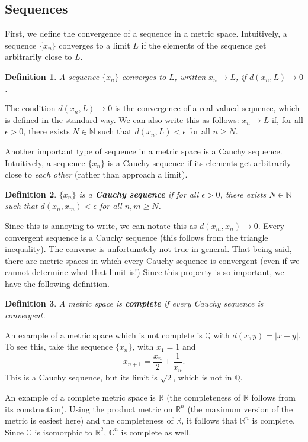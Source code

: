 \documentclass[12pt]{amsart}         %
\newtheorem{definition}{Definition}[section]
\theoremstyle{remark}
\newcommand{\N}{\mathbb{N}}
\newcommand{\C}{\mathbb{C}}
\newcommand{\R}{\mathbb{R}}
\newcommand{\Q}{\mathbb{Q}}
\begin{document}
\subsection{Sequences}

First, we define the convergence of a sequence in a metric space. Intuitively, a sequence $\{x_n\}$ converges to a limit $L$ if the elements of the sequence get arbitrarily close to $L$.
\begin{definition}
A sequence $\{x_n\}$ \emph{converges} to $L$, written $x_n \rightarrow L$, if $d(x_n, L) \rightarrow 0$.
\end{definition}
The condition $d(x_n, L) \rightarrow 0$ is the convergence of a real-valued sequence, which is defined in the standard way. We can also write this as follows: $x_n \rightarrow L$ if, for all $\epsilon > 0$, there exists $N \in \N$ such that $d(x_n, L) < \epsilon$ for all $n \geq N$. 

Another important type of sequence in a metric space is a Cauchy sequence. Intuitively, a sequence $\{x_n\}$ is a Cauchy sequence if its elements get arbitrarily close to \emph{each other} (rather than approach a limit).
\begin{definition}
$\{x_n\}$ is a \textbf{Cauchy sequence} if for all $\epsilon > 0$, there exists $N \in \N$ such that $d(x_n, x_m) < \epsilon$ for all $n,m \geq N$.
\end{definition}
Since this is annoying to write, we can notate this as $d(x_m, x_n) \rightarrow 0$. Every convergent sequence is a Cauchy sequence (this follows from the triangle inequality). The converse is unfortunately not true in general. That being said, there are metric spaces in which every Cauchy sequence is convergent (even if we cannot determine what that limit is!) Since this property is so important, we have the following definition.

\begin{definition}A metric space is \textbf{complete} if every Cauchy sequence is convergent.
\end{definition}

An example of a metric space which is not complete is $\mathbb{Q}$ with $d(x,y) = |x-y|$. To see this, take the sequence $\{x_n\}$, with $x_1 = 1$ and 
\[
x_{n+1} = \frac{x_n}{2} + \frac{1}{x_n}.
\]
This is a Cauchy sequence, but its limit is $\sqrt{2}$, which is not in $\Q$.

An example of a complete metric space is $\R$ (the completeness of $\R$ follows from its construction). Using the product metric on $\R^n$ (the maximum version of the metric is easiest here) and the completeness of $\R$, it follows that $\R^n$ is complete. Since $\C$ is isomorphic to $\R^2$, $\C^n$ is complete as well.
\end{document}
